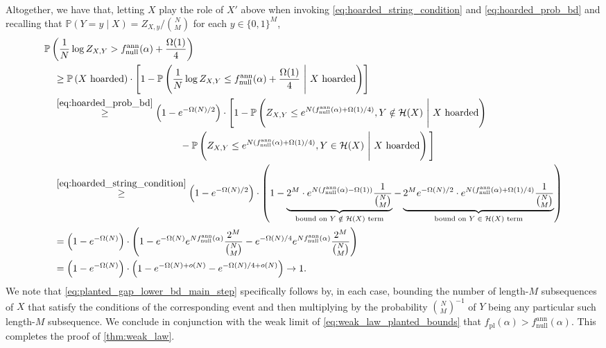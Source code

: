 \documentclass[11pt]{amsart}
\numberwithin{equation}{section}
\numberwithin{equation}{section}
\newcommand{\1}{\mathbbm{1}}
\newcommand{\Prob}{\mathbb{P}}
\newcommand{\fpl}{f_{\mathrm{pl}}}
\newcommand{\fnullann}{f_{\mathrm{null}}^{\mathrm{ann}}}
\theoremstyle{definition}
\begin{document}
Altogether, we have that, letting $X$ play the role of $X'$ above when invoking \eqref{eq:hoarded_string_condition} and \eqref{eq:hoarded_prob_bd} and recalling that $\Prob(Y = y \mid X) = Z_{X,y}/\binom{N}{M}$ for each $y \in \{0,1\}^M$,
\begin{align}
    & \Prob\left( \frac{1}{N} \log Z_{X, Y} > \fnullann(\alpha) + \frac{\Omega(1)}{4} \right) \nonumber \\
    & \quad \geq \Prob\left( X \text{ hoarded} \right) \cdot \left[ 1 - \Prob\left( \frac{1}{N} \log Z_{X, Y} \leq \fnullann(\alpha) + \frac{\Omega(1)}{4} \ \Bigg| \ X \text{ hoarded} \right) \right] \nonumber \\
    & \quad \stackrel{\eqref{eq:hoarded_prob_bd}}{\geq} \left( 1 - e^{-\Omega(N)/2} \right) \cdot \Biggl[ 1 - \Prob\left( Z_{X, Y} \leq e^{N\left( \fnullann(\alpha) + \Omega(1)/4 \right)}, Y \notin \mathcal H(X) \ \Bigg| \ X \text{ hoarded} \right) \nonumber \\
    & \qquad \qquad \qquad \qquad  \qquad \qquad \qquad - \Prob\left( Z_{X, Y} \leq e^{N\left( \fnullann(\alpha) + \Omega(1)/4 \right)}, Y \in \mathcal H(X) \ \Bigg| \ X \text{ hoarded} \right) \Bigg] \nonumber \\ 
    & \ \ \ \stackrel{\eqref{eq:hoarded_string_condition}}{\geq} \left( 1 - e^{-\Omega(N)/2} \right) \cdot \left( 1 - \underbrace{2^M \cdot e^{N\left( \fnullann(\alpha) - \Omega(1) \right)}\frac{1}{\binom{N}{M}}}_{\text{bound on $Y \notin \mathcal H(X)$ term}} - \underbrace{2^Me^{-\Omega(N)/2} \cdot e^{N\left(\fnullann(\alpha) + \Omega(1)/4 \right)} \frac{1}{\binom{N}{M}}}_{\text{bound on $Y \in \mathcal H(X)$ term}} \right) \label{eq:planted_gap_lower_bd_main_step} \\
    & \quad = \left( 1 - e^{-\Omega(N)} \right) \cdot \left( 1 - e^{-\Omega(N)} e^{N \fnullann(\alpha)} \frac{2^M}{\binom{N}{M}} - e^{-\Omega(N)/4} e^{N \fnullann(\alpha)} \frac{2^M}{\binom{N}{M}}\right) \nonumber \\
    & \quad = \left( 1 - e^{-\Omega(N)} \right) \cdot \left( 1 - e^{-\Omega(N) + o(N)} - e^{-\Omega(N)/4 + o(N)} \right) \to 1.\label{eq:planted_gap_lower_bd}
\end{align}
We note that \eqref{eq:planted_gap_lower_bd_main_step} specifically follows by, in each case, bounding the number of length-$M$ subsequences of $X$ that satisfy the conditions of the corresponding event and then multiplying by the probability $\binom{N}{M}^{-1}$ of $Y$ being any particular such length-$M$ subsequence. We conclude in conjunction with the weak limit of \eqref{eq:weak_law_planted_bounds} that $\fpl(\alpha) > \fnullann(\alpha)$. This completes the proof of \cref{thm:weak_law}.
\end{document}
